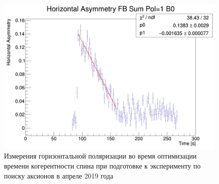 \begin{figure}[H]\centering
	\includegraphics[height=.3\paperheight]{images/chapter4/SCT-April-2019/11th_20-20}
\caption{Измерения горизонтальной поляризации во время оптимизации времени когерентности спина при подготовке к эксперименту по поиску аксионов в апреле 2019 года\label{fig:April2019:Polarization}}
\end{figure}
